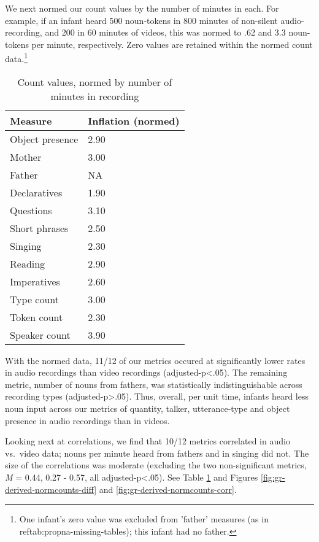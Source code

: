 \documentclass[floatsintext,man]{apa6}
\theoremstyle{definition}
\theoremstyle{definition}
\theoremstyle{definition}
\theoremstyle{remark}
\begin{document}
We next normed our count values by the number of minutes in each. For
example, if an infant heard 500 noun-tokens in 800 minutes of non-silent
audio-recording, and 200 in 60 minutes of videos, this was normed to .62
and 3.3 noun-tokens per minute, respectively. Zero values are retained
within the normed count
data.\footnote{One infant's zero value was excluded from 'father' measures (as in \\ref{tab:propna-missing-tables}); this infant had no father.}

\begin{table}[tbp]
\begin{center}
\begin{threeparttable}
\caption{\label{tab:normtable}Count values, normed by number of minutes in recording}
\small{
\begin{tabular}{ll}
\toprule
Measure & \multicolumn{1}{c}{Inflation (normed)}\\
\midrule
Object presence & 2.90\\
Mother & 3.00\\
Father & NA\\
Declaratives & 1.90\\
Questions & 3.10\\
Short phrases & 2.50\\
Singing & 2.30\\
Reading & 2.90\\
Imperatives & 2.60\\
Type count & 3.00\\
Token count & 2.30\\
Speaker count & 3.90\\
\bottomrule
\end{tabular}
}
\end{threeparttable}
\end{center}
\end{table}

With the normed data, 11/12 of our metrics occured at significantly
lower rates in audio recordings than video recordings
(adjusted-p\textless{}.05). The remaining metric, number of nouns from
fathers, was statistically indistinguishable across recording types
(adjusted-p\textgreater{}.05). Thus, overall, per unit time, infants
heard less noun input across our metrics of quantity, talker,
utterance-type and object presence in audio recordings than in videos.

Looking next at correlations, we find that 10/12 metrics correlated in
audio vs.~video data; nouns per minute heard from fathers and in singing
did not. The size of the correlations was moderate (excluding the two
non-significant metrics, \emph{M} = 0.44, 0.27 - 0.57, all
adjusted-p\textless{}.05). See Table \ref{tab:normtable} and Figures
\ref{fig:gr-derived-normcounts-diff} and
\ref{fig:gr-derived-normcounts-corr}.
\end{document}
